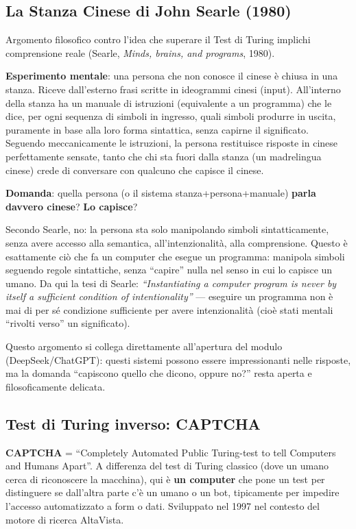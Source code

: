 \documentclass[11pt,a4paper]{report}
\begin{document}
\subsection{La Stanza Cinese di John Searle (1980)}

Argomento filosofico contro l'idea che superare il Test di Turing implichi comprensione reale (Searle, \emph{Minds, brains, and programs}, 1980).

\textbf{Esperimento mentale}: una persona che non conosce il cinese è chiusa in una stanza. Riceve dall'esterno frasi scritte in ideogrammi cinesi (input). All'interno della stanza ha un manuale di istruzioni (equivalente a un programma) che le dice, per ogni sequenza di simboli in ingresso, quali simboli produrre in uscita, puramente in base alla loro forma sintattica, senza capirne il significato. Seguendo meccanicamente le istruzioni, la persona restituisce risposte in cinese perfettamente sensate, tanto che chi sta fuori dalla stanza (un madrelingua cinese) crede di conversare con qualcuno che capisce il cinese.

\textbf{Domanda}: quella persona (o il sistema stanza+persona+manuale) \textbf{parla davvero cinese}? \textbf{Lo capisce}?

Secondo Searle, no: la persona sta solo manipolando simboli sintatticamente, senza avere accesso alla semantica, all'intenzionalità, alla comprensione. Questo è esattamente ciò che fa un computer che esegue un programma: manipola simboli seguendo regole sintattiche, senza ``capire'' nulla nel senso in cui lo capisce un umano. Da qui la tesi di Searle: \emph{``Instantiating a computer program is never by itself a sufficient condition of intentionality''} --- eseguire un programma non è mai di per sé condizione sufficiente per avere intenzionalità (cioè stati mentali ``rivolti verso'' un significato).

Questo argomento si collega direttamente all'apertura del modulo (DeepSeek/ChatGPT): questi sistemi possono essere impressionanti nelle risposte, ma la domanda ``capiscono quello che dicono, oppure no?'' resta aperta e filosoficamente delicata.

\subsection{Test di Turing inverso: CAPTCHA}

\textbf{CAPTCHA} = ``Completely Automated Public Turing-test to tell Computers and Humans Apart''. A differenza del test di Turing classico (dove un umano cerca di riconoscere la macchina), qui è \textbf{un computer} che pone un test per distinguere se dall'altra parte c'è un umano o un bot, tipicamente per impedire l'accesso automatizzato a form o dati. Sviluppato nel 1997 nel contesto del motore di ricerca AltaVista.
\end{document}
